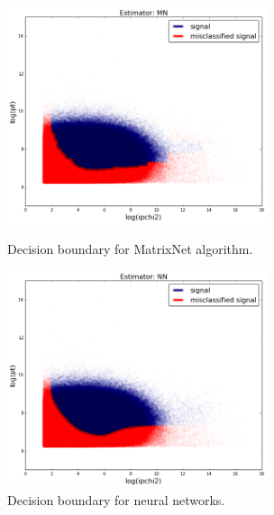 \documentclass[a4paper]{jpconf}
\begin{document}
\begin{figure}[h]
\begin{minipage}{18pc}\vspace{1pc}%
\includegraphics[width=18pc]{../images/mn-track-db}
\caption{\label{hlt1mn} Decision boundary for MatrixNet algorithm.}
\end{minipage}\hspace{2pc}%
\begin{minipage}{18pc}\vspace{1pc}%
\includegraphics[width=18pc]{../images/nn-track-db}
\caption{\label{hlt1nn} Decision boundary for neural networks.}
\end{minipage} 
\end{figure}
\end{document}
